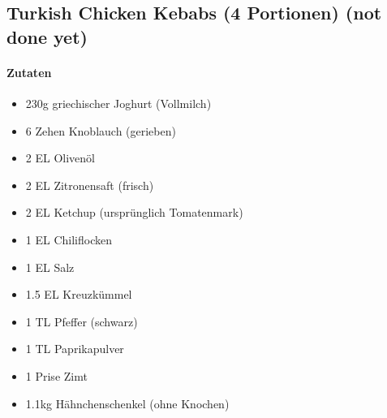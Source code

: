 \newpage
\subsection{Turkish Chicken Kebabs (4 Portionen) (not done yet)}
\paragraph{Zutaten}
\begin{itemize}[noitemsep]
	\item 230g griechischer Joghurt (Vollmilch)
	\item 6 Zehen Knoblauch (gerieben)
	\item 2 EL Olivenöl
	\item 2 EL Zitronensaft (frisch)
	\item 2 EL Ketchup (ursprünglich Tomatenmark)
	\item 1 EL Chiliflocken
	\item 1 EL Salz
	\item 1.5 EL Kreuzkümmel
	\item 1 TL Pfeffer (schwarz)
	\item 1 TL Paprikapulver
	\item 1 Prise Zimt
	\item 1.1kg Hähnchenschenkel (ohne Knochen)
\end{itemize}
